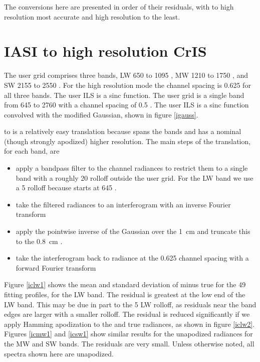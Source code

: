 \documentclass[12pt]{article}
\begin{document}
The conversions here are presented in order of their residuals, with
{\iasi} to high resolution {\cris} most accurate and high resolution
{\cris} to {\airs} the least.


\section{IASI to high resolution CrIS}

The {\cris} user grid comprises three bands, LW 650 to 1095 {\wn},
MW 1210 to 1750 {\wn}, and SW 2155 to 2550 {\wn}.  For the {\cris}
high resolution mode the channel spacing is 0.625 {\wn} for all
three bands.  The {\cris} user ILS is a sinc function.  The {\iasi}
user grid is a single band from 645 to 2760 {\wn} with a channel
spacing of 0.5 {\wn}.  The {\iasi} user ILS is a sinc function
convolved with the modified Gaussian, shown in figure \ref{igauss}.

{\iasi} to {\cris} is a relatively easy translation because {\iasi}
spans the {\cris} bands and has a nominal (though strongly apodized)
higher resolution.  The main steps of the translation, for each
{\cris} band, are

\begin{itemize}

  \item apply a bandpass filter to the {\iasi} channel radiances to
    restrict them to a single {\cris} band with a roughly 20 {\wn}
    rolloff outside the {\cris} user grid.  For the LW band we use
    a 5 {\wn} rolloff because {\iasi} starts at 645 {\wn}.

  \item take the filtered radiances to an interferogram with an
    inverse Fourier transform

  \item apply the pointwise inverse of the {\iasi} Gaussian over the 
    {\iasi} 1~cm {\opd} and truncate this to the 0.8~cm {\cris} {\opd}.

  \item take the interferogram back to radiance at the {\cris}
    0.625 {\wn} channel spacing with a forward Fourier transform

\end{itemize}

Figure \ref{iclw1} shows the mean and standard deviation of {\iasi}
{\cris} minus true {\cris} for the 49 fitting profiles, for the
{\cris} LW band.  The residual is greatest at the low end of the LW
band.  This may be due in part to the 5 {\wn} LW rolloff, as
residuals near the band edges are larger with a smaller rolloff.
The residual is reduced significantly if we apply Hamming
apodization to the {\iasi} {\cris} and true {\cris} radiances, as
shown in figure \ref{iclw2}.  Figures \ref{icmw1} and \ref{icsw1}
show similar results for the unapodized radiances for the MW and SW
bands. The residuals are very small.  Unless otherwise noted, all
{\cris} spectra shown here are unapodized.
\end{document}
